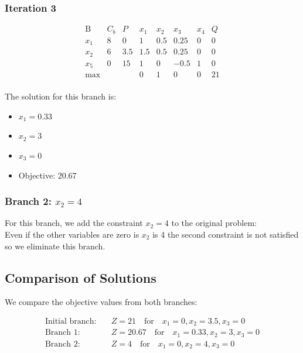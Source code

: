 \documentclass[12pt]{article}
\begin{document}
\subsubsection*{Iteration 3}

\[
\begin{array}{c|ccccc|c}
\text{B} & C_b & P & x_1 & x_2 & x_3 & x_4 & Q \\
\hline
x_1 & 8 & 0 & 1 & 0.5 & 0.25 & 0 & 0 \\
x_2 & 6 & 3.5 & 1.5 & 0.5 & 0.25 & 0 & 0 \\
x_5 & 0 & 15 & 1 & 0 & -0.5 & 1 & 0 \\
\hline
\text{max} & & & 0 & 1 & 0 & 0 & 21 \\
\end{array}
\]

The solution for this branch is:

\begin{itemize}
    \item \(x_1 = 0.33\)
    \item \(x_2 = 3\)
    \item \(x_3 = 0\)
    \item Objective: 20.67
\end{itemize}

\subsubsection*{Branch 2: \(x_2 = 4\)}

For this branch, we add the constraint \( x_2 = 4 \) to the original problem: \\

Even if the other variables are zero is $x_2$ is 4 the second constraint is not satisfied so we eliminate this branch.
\subsection*{Comparison of Solutions}

We compare the objective values from both branches:

\[
\begin{aligned}
\text{Initial branch:} & \quad Z = 21 \quad \text{for} \quad x_1 = 0, x_2 = 3.5, x_3 = 0 \\
\text{Branch 1:} & \quad Z = 20.67 \quad \text{for} \quad x_1 = 0.33, x_2 = 3, x_3 = 0 \\
\text{Branch 2:} & \quad Z = 4 \quad \text{for} \quad x_1 = 0, x_2 = 4, x_3 = 0 \\

\end{aligned}
\]
\end{document}
